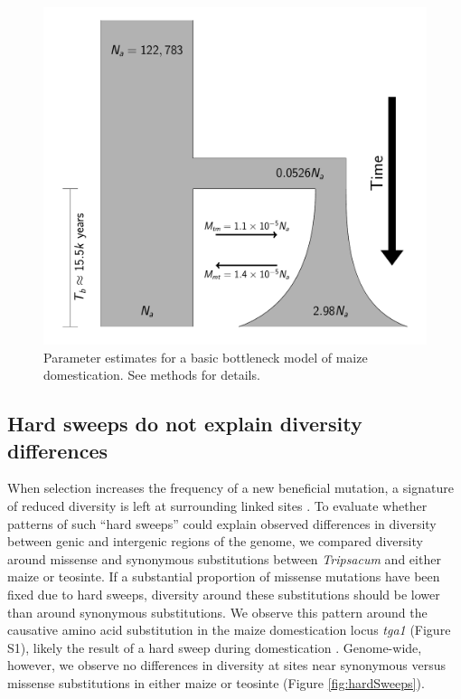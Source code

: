 \documentclass[12pt,a4paper]{article}
\newcommand{\mbh}[1]{\textcolor{blue}{\scriptsize #1}}
\begin{document}
\begin{figure}[!tb]
\centering
\includegraphics[width=.5\textwidth]{FigsAndFiles/DomesticationModel/domesticationModel.pdf}
\caption{Parameter estimates for a basic bottleneck model of maize domestication. See methods for details. \label{fig:bottleneck} }
\end{figure}


\subsection*{Hard sweeps do not explain diversity differences} %
When selection increases the frequency of a new beneficial mutation, a signature of reduced diversity is left at surrounding linked sites \cite{smith1974}.
To evaluate whether patterns of such ``hard sweeps'' could explain observed differences in diversity between genic and intergenic regions of the genome, we compared diversity around missense and synonymous substitutions between \emph{Tripsacum} and either maize or teosinte.
If a substantial proportion of missense mutations have been fixed due to hard sweeps, diversity around these substitutions should be lower than around synonymous substitutions. 
We observe this pattern around the causative amino acid substitution in the maize domestication locus \emph{tga1} (Figure S1), likely the result of a hard sweep during domestication \cite{wang2015}. Genome-wide, however, we observe no differences in diversity at sites near synonymous versus missense substitutions in either maize or teosinte (Figure \ref{fig:hardSweeps}).

\end{document}
